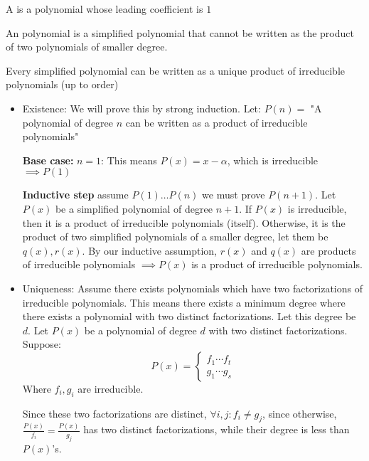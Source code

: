 \documentclass[10pt]{article}
\begin{document}
\begin{definition}

A  is a polynomial whose leading coefficient is $1$

\end{definition}

\begin{definition}

An  polynomial is a simplified polynomial that cannot be written as the product of two polynomials of smaller degree.

\end{definition}

\newpage
\begin{lemma}[polyFac]{Every simplified polynomial can be written as a unique product of irreducible polynomials (up to order)}

\begin{itemize}
    \item Existence: We will prove this by strong induction. Let: $P(n) = $ "A polynomial of degree $n$ can be written as a product of irreducible polynomials"
    
    \textbf{Base case:} $n=1$: This means $P(x)=x-\alpha$, which is irreducible $\implies P(1)$
    
    \textbf{Inductive step} assume $P(1)\dots P(n)$ we must prove $P(n+1)$. 
    Let $P(x)$ be a simplified polynomial of degree $n+1$. If $P(x)$ is irreducible, then it is a product of irreducible polynomials (itself). Otherwise, it is the product of two simplified polynomials of a smaller degree, let them be $q(x), r(x)$. By our inductive assumption, $r(x)$ and $q(x)$ are products of irreducible polynomials $\implies P(x)$ is a product of irreducible polynomials.
    
    \item Uniqueness: Assume there exists polynomials which have two factorizations of irreducible polynomials. This means there exists a minimum degree where there exists a polynomial with two distinct factorizations. Let this degree be $d$. Let $P(x)$ be a polynomial of degree $d$ with two distinct factorizations. Suppose:
    \[ P(x) = \begin{cases} f_1\cdots f_t \\ g_1\cdots g_s \end{cases} \]
    Where $f_i, g_i$ are irreducible.
    
    Since these two factorizations are distinct, $\forall i,j: f_i\neq g_j$, since otherwise, $\frac{P(x)}{f_i}=\frac{P(x)}{g_j}$ has two distinct factorizations, while their degree is less than $P(x)$'s.
    

\end{itemize}
\end{lemma}
\end{document}
